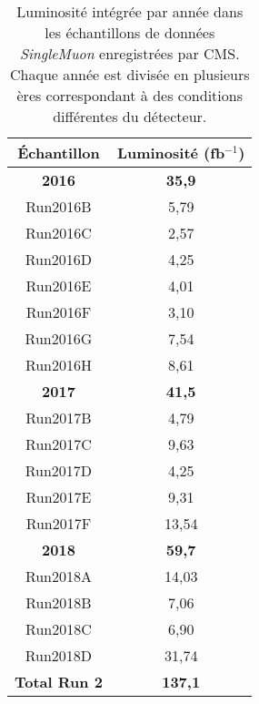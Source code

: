 \begin{table}[!ht]
\centering
\begin{tabular}{|c|c|}
\hline
Échantillon    & Luminosité (fb$^{-1}$) \\ \hline \hline
\textbf{2016}  & \textbf{35,9}          \\ \hline
Run2016B       & 5,79                   \\
Run2016C       & 2,57                   \\
Run2016D       & 4,25                   \\
Run2016E       & 4,01                   \\
Run2016F       & 3,10                   \\
Run2016G       & 7,54                   \\
Run2016H       & 8,61                   \\ \hline \hline
\textbf{2017}  & \textbf{41,5}          \\ \hline 
Run2017B       & 4,79                   \\
Run2017C       & 9,63                   \\
Run2017D       & 4,25                   \\
Run2017E       & 9,31                   \\
Run2017F       & 13,54                  \\ \hline \hline
\textbf{2018}  & \textbf{59,7}          \\ \hline
Run2018A       & 14,03                  \\
Run2018B       & 7,06                   \\
Run2018C       & 6,90                   \\
Run2018D       & 31,74                  \\ \hline \hline
\textbf{Total Run 2} & \textbf{137,1}           \\ \hline 
\end{tabular}
\caption{Luminosité intégrée par année dans les échantillons de données \textit{SingleMuon} enregistrées par CMS. Chaque année est divisée en plusieurs ères correspondant à des conditions différentes du détecteur.}
\label{lumiData}
\end{table}